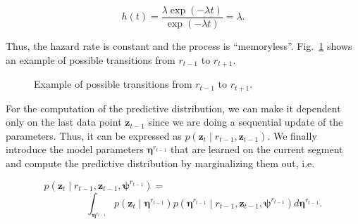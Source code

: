 \begin{equation}
\label{eqn:hazardexp}
h(t) = \frac{\lambda\exp(-\lambda t)}{\exp(-\lambda t)} = \lambda.
\end{equation}

Thus, the hazard rate is constant and the process is ``memoryless''.
Fig.~\ref{fig:transition} shows an example of possible transitions
from $r_{t-1}$ to $r_{t+1}$.

\begin{figure}[t]
\centering
{}
\caption{Example of possible transitions from $r_{t-1}$ to $r_{t+1}$.}
\label{fig:transition}
\end{figure}

For the computation of the predictive distribution, we can make it dependent
only on the last data point $\mathbf{z}_{t-1}$ since we are doing a sequential
update of the parameters. Thus, it can be expressed as $p(\mathbf{z}_t
\mid r_{t-1}, \mathbf{z}_{t-1})$. We finally
introduce the model parameters $\boldsymbol{\eta}^{r_{t-1}}$ that are learned
on the current segment and compute the predictive distribution by marginalizing
them out, i.e.

\begin{equation}
\label{eqn:preddistr}
p(\mathbf{z}_t\mid r_{t-1},\mathbf{z}_{t-1},\boldsymbol{\psi}^{r_{t-1}})
= \phantom{aaaaaaaaaaaaaaaaaaaaaaaaaaaaaa}\nonumber
\end{equation}
\begin{equation}
 \phantom{aaaaaaaa}\int_{\boldsymbol{\eta}^{r_{t-1}}}
p(\mathbf{z}_t\mid\boldsymbol{\eta}^{r_{t-1}})p(\boldsymbol{\eta}^{r_{t-1}}\mid
r_{t-1},\mathbf{z}_{t-1},\boldsymbol{\psi}^{r_{t-1}})
d\boldsymbol{\eta}^{r_{t-1}}.
\end{equation}

